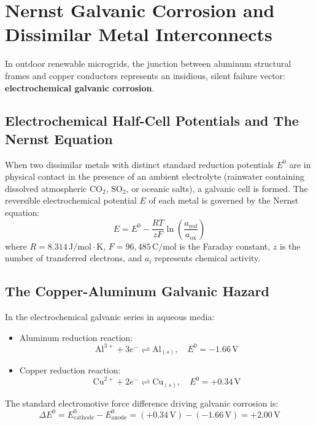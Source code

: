 \section{Nernst Galvanic Corrosion and Dissimilar Metal Interconnects}
\label{sec:em_corrosion}

In outdoor renewable microgrids, the junction between aluminum structural frames and copper conductors represents an insidious, silent failure vector: \textbf{electrochemical galvanic corrosion}.

\subsection{Electrochemical Half-Cell Potentials and The Nernst Equation}
When two dissimilar metals with distinct standard reduction potentials $E^0$ are in physical contact in the presence of an ambient electrolyte (rainwater containing dissolved atmospheric $\mathrm{CO_2}$, $\mathrm{SO_2}$, or oceanic salts), a galvanic cell is formed. The reversible electrochemical potential $E$ of each metal is governed by the Nernst equation:
\begin{equation}
E = E^0 - \frac{R T}{z F} \ln\left( \frac{a_{\mathrm{red}}}{a_{\mathrm{ox}}} \right)
\label{eq:nernst_equation}
\end{equation}
where $R = 8.314\,\mathrm{J/mol\cdot K}$, $F = 96,485\,\mathrm{C/mol}$ is the Faraday constant, $z$ is the number of transferred electrons, and $a_i$ represents chemical activity.

\subsection{The Copper-Aluminum Galvanic Hazard}
In the electrochemical galvanic series in aqueous media:
\begin{itemize}
    \item Aluminum reduction reaction:
    \begin{equation}
    \mathrm{Al}^{3+} + 3e^- \rightleftharpoons \mathrm{Al}_{(s)}, \quad E^0 = -1.66\,\mathrm{V}
    \label{eq:al_reduction}
    \end{equation}
    \item Copper reduction reaction:
    \begin{equation}
    \mathrm{Cu}^{2+} + 2e^- \rightleftharpoons \mathrm{Cu}_{(s)}, \quad E^0 = +0.34\,\mathrm{V}
    \label{eq:cu_reduction}
    \end{equation}
\end{itemize}
The standard electromotive force difference driving galvanic corrosion is:
\begin{equation}
\Delta E^0 = E^0_{\mathrm{cathode}} - E^0_{\mathrm{anode}} = (+0.34\,\mathrm{V}) - (-1.66\,\mathrm{V}) = +2.00\,\mathrm{V}
\label{eq:galvanic_emf}
\end{equation}

